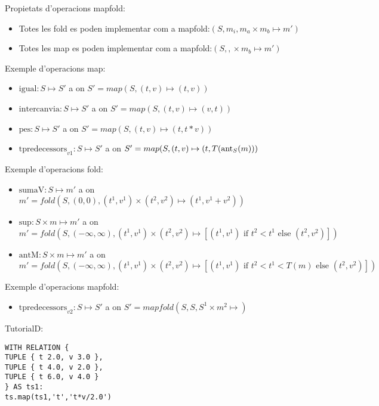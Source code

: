 Propietats d'operacions mapfold:
\begin{itemize}
\item Totes les fold es poden implementar com a mapfold:$(S,{m_i},
  {m_a} \times m_b \mapsto {m'})$

\item Totes les map es poden implementar com a mapfold:$(S,{},
  {} \times m_b \mapsto {m'})$
\end{itemize}



Exemple d'operacions map:
\begin{itemize}
\item $\text{igual}: S \mapsto S'$ a on $S'= map(S,(t,v)\mapsto(t,v))$
\item $\text{intercanvia}: S \mapsto S'$ a on $S'= map(S,(t,v)\mapsto(v,t))$
\item $\text{pes}: S \mapsto S'$ a on $S'= map(S,(t,v)\mapsto(t,t*v))$
\item $\text{tpredecessors}_{v1}: S \mapsto S'$ a on $S'= map(S,(t,v)
  \mapsto (t,T(\operatorname*{ant}_S(m)))$
\end{itemize}

Exemple d'operacions fold:
\begin{itemize}
\item $\text{sumaV}: S \mapsto m'$ a on $m'=
  fold(S,(0,0),(t^1,v^1)\times(t^2,v^2)\mapsto(t^1,v^1+v^2))$
\item $\text{sup}: S \times m \mapsto m'$ a on $m'=
  fold(S,(-\infty,\infty),(t^1,v^1)\times(t^2,v^2)\mapsto [(t^1,v^1)
  \text{ if } t^2 < t^1 \text{ else } (t^2,v^2) ])$
\item $\text{antM}: S \times m \mapsto m'$ a on $m'=
  fold(S,(-\infty,\infty),(t^1,v^1)\times(t^2,v^2)\mapsto [(t^1,v^1)
  \text{ if } t^2 < t^1 < T(m) \text{ else } (t^2,v^2) ])$
\end{itemize}


Exemple d'operacions mapfold:
\begin{itemize}
\item $\text{tpredecessors}_{v2}: S \mapsto S'$ a on $S'= mapfold(S,S,S^1\times m^2\mapsto )$
\end{itemize}




TutorialD:
\begin{verbatim}
WITH RELATION {
TUPLE { t 2.0, v 3.0 },
TUPLE { t 4.0, v 2.0 },
TUPLE { t 6.0, v 4.0 }
} AS ts1: 
ts.map(ts1,'t','t*v/2.0')
\end{verbatim}

